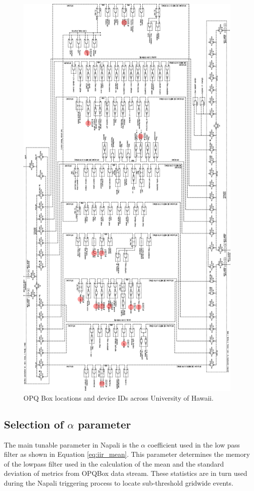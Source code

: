 \begin{figure}[H]
    \centering
    \includegraphics[width=0.7\linewidth]{img/deployment/uh_power_grid.pdf}
    \caption{OPQ Box locations and device IDs across University of Hawaii.}
    \label{expdes:fig:deploy}
\end{figure}
\clearpage
\subsection{Selection of $\alpha$ parameter}\label{subsec:selectrion-ofparameter}

The main tunable parameter in Napali is the $\alpha$ coefficient used in the low pass filter as shown in Equation \ref{eq:iir_mean}.
This parameter determines the memory of the lowpass filter used in the calculation of the mean and the standard deviation of metrics from OPQBox data stream.
These statistics are in turn used during the Napali triggering process to locate sub-threshold gridwide events.


